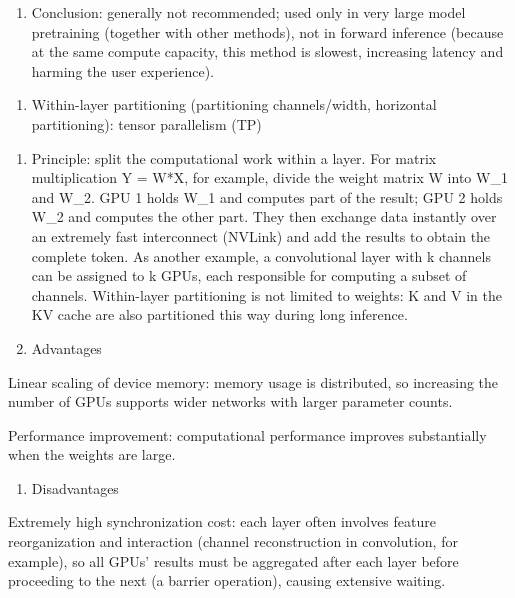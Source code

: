 \begin{enumerate}
\def\labelenumi{(\arabic{enumi})}
\setcounter{enumi}{3}
\tightlist
\item
  Conclusion: generally not recommended; used only in very large model pretraining (together with other methods), not in forward inference (because at the same compute capacity, this method is slowest, increasing latency and harming the user experience).
\end{enumerate}

\begin{enumerate}
\def\labelenumi{\arabic{enumi}.}
\setcounter{enumi}{1}
\tightlist
\item
  Within-layer partitioning (partitioning channels/width, horizontal partitioning): tensor parallelism (TP)
\end{enumerate}

\begin{enumerate}
\def\labelenumi{(\arabic{enumi})}
\item
  Principle: split the computational work within a layer. For matrix multiplication Y = W*X, for example, divide the weight matrix W into W\_1 and W\_2. GPU 1 holds W\_1 and computes part of the result; GPU 2 holds W\_2 and computes the other part. They then exchange data instantly over an extremely fast interconnect (NVLink) and add the results to obtain the complete token. As another example, a convolutional layer with k channels can be assigned to k GPUs, each responsible for computing a subset of channels. Within-layer partitioning is not limited to weights: K and V in the KV cache are also partitioned this way during long inference.
\item
  Advantages
\end{enumerate}

Linear scaling of device memory: memory usage is distributed, so increasing the number of GPUs supports wider networks with larger parameter counts.

Performance improvement: computational performance improves substantially when the weights are large.

\begin{enumerate}
\def\labelenumi{(\arabic{enumi})}
\setcounter{enumi}{2}
\tightlist
\item
  Disadvantages
\end{enumerate}

Extremely high synchronization cost: each layer often involves feature reorganization and interaction (channel reconstruction in convolution, for example), so all GPUs' results must be aggregated after each layer before proceeding to the next (a barrier operation), causing extensive waiting.

